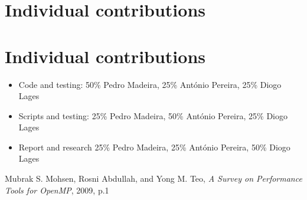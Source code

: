 \documentclass[10pt,journal,compsoc]{IEEEtran}
\begin{document}
\ifCLASSOPTIONcaptionsoff
  \newpage
\fi

\ifCLASSOPTIONcompsoc
  \section*{Individual contributions}
\else
  \section*{Individual contributions}
\fi
\begin{itemize}
    \item Code and testing: 50\% Pedro Madeira, 25\% António Pereira, 25\% Diogo Lages
    \item Scripts and testing: 25\% Pedro Madeira, 50\% António Pereira, 25\% Diogo Lages
    \item Report and research 25\% Pedro Madeira, 25\% António Pereira, 50\% Diogo Lages
\end{itemize}


\begin{thebibliography}{1}

Mubrak S. Mohsen, Rosni Abdullah, and Yong M. Teo, \emph{A Survey on Performance Tools for OpenMP}, 2009, p.1

\end{thebibliography}

\end{document}
